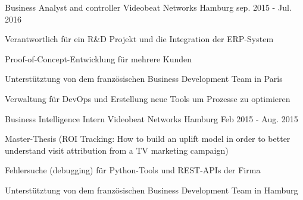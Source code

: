 

\begin{cventries}

  \cventry
    {Business Analyst and controller} %
    {Videobeat Networks} %
    {Hamburg} %
    {sep. 2015 - Jul. 2016} %
    {
      \begin{cvitems} %
        \item {Verantwortlich für ein R\&D Projekt und die Integration der ERP-System}
        \item {Proof-of-Concept-Entwicklung für mehrere Kunden}
        \item {Unterstütztung von dem französischen Business Development Team in Paris}
        \item {Verwaltung für DevOps und Erstellung neue Tools um Prozesse zu optimieren}
      \end{cvitems}
    }

  \cventry
    {Business Intelligence Intern} %
    {Videobeat Networks} %
    {Hamburg} %
    {Feb 2015 - Aug. 2015} %
    {
      \begin{cvitems} %
        \item {Master-Thesis (ROI Tracking: How to build an uplift model in order to better understand visit attribution from a TV marketing campaign)}
        \item {Fehlersuche (debugging) für Python-Tools und REST-APIs der Firma}
        \item {Unterstütztung von dem französischen Business Development Team in Hamburg}
      \end{cvitems}
    }


\end{cventries}
